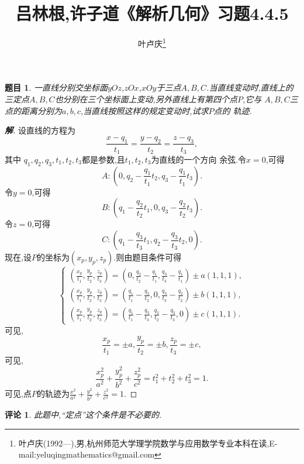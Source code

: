 \documentclass[a4paper]{article}
\newtheorem*{exe}{题目}
\newtheorem*{rem}{评论}
\newenvironment{exercise}
{\bigskip\begin{mdframed}\begin{exe}}
    {\end{exe}\end{mdframed}\bigskip}
\newenvironment{remark}
{\bigskip\begin{mdframed}\begin{rem}}
    {\end{rem}\end{mdframed}\bigskip}
\newcommand{\ov}{\overrightarrow}
\begin{document}
\title{\huge{\bf{吕林根,许子道《解析几何》习题4.4.5}}} \author{\small{叶卢庆\footnote{叶卢庆(1992---),男,杭州师范大学理学院数学与应用数学专业本科在读,E-mail:yeluqingmathematics@gmail.com}}}
\maketitle
\begin{exercise}
一直线分别交坐标面$yOz$,$zOx$,$xOy$于三点$A,B,C$.当直线变动时,直线上的
三定点$A,B,C$也分别在三个坐标面上变动,另外直线上有第四个点$P$,它与
$A,B,C$三点的距离分别为$a,b,c$,当直线按照这样的规定变动时,试求$P$点的
轨迹.  
\end{exercise}
\begin{proof}[\textbf{解}]
设直线的方程为
$$
\frac{x-q_1}{t_1}=\frac{y-q_2}{t_2}=\frac{z-q_3}{t_3},
$$
其中 $q_1,q_2,q_3,t_1,t_2,t_3$都是参数,且$t_1,t_2,t_3$为直线的一个方向
余弦.令$x=0$,可得
$$
A:(0,q_2-\frac{q_1}{t_1}t_2,q_3-\frac{q_1}{t_1}t_3).
$$
令$y=0$,可得
$$
B:(q_1-\frac{q_2}{t_2}t_1,0,q_3-\frac{q_2}{t_2}t_3).
$$
令$z=0$,可得
$$
C:(q_1-\frac{q_3}{t_3}t_1,q_2-\frac{q_3}{t_3}t_2,0).
$$
现在,设$P$的坐标为$(x_{p},y_{p},z_p)$.则由题目条件可得
$$
\begin{cases}
  (\frac{x_p}{t_1},\frac{y_p}{t_2},\frac{z_p}{t_3})=(0,\frac{q_2}{t_{2}}-\frac{q_1}{t_1},\frac{q_3}{t_{3}}-\frac{q_1}{t_1})\pm
  a(1,1,1),\\
(\frac{x_p}{t_1},\frac{y_p}{t_2},\frac{z_p}{t_3})=(\frac{q_1}{t_{1}}-\frac{q_2}{t_2},0,\frac{q_3}{t_{3}}-\frac{q_2}{t_2})\pm
b(1,1,1),\\
(\frac{x_p}{t_1},\frac{y_p}{t_2},\frac{z_p}{t_3})=(\frac{q_1}{t_{1}}-\frac{q_3}{t_3},\frac{q_2}{t_{2}}-\frac{q_3}{t_3},0)\pm c(1,1,1).
\end{cases}
$$
可见,
$$
\frac{x_p}{t_1}=\pm a,\frac{y_p}{t_2}=\pm b,\frac{z_p}{t_3}=\pm c,
$$
可见,
$$
\frac{x_p^2}{a^2}+\frac{y_p^2}{b^2}+\frac{z_p^2}{c^2}=t_1^{2}+t_{2}^{2}+t_{3}^{2}=1.
$$
可见,点$P$的轨迹为$\frac{x^2}{a^2}+\frac{y^2}{b^2}+\frac{z^2}{c^2}=1$.
\end{proof}
\begin{remark}
此题中,“定点”这个条件是不必要的.  
\end{remark}
\end{document}
